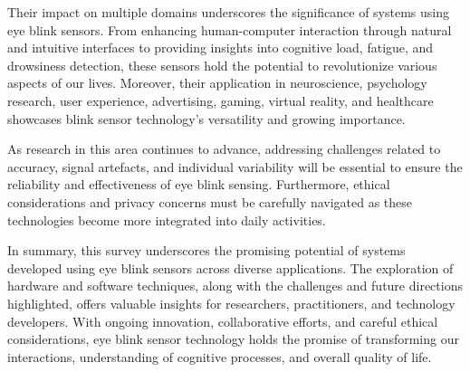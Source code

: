 \documentclass[conference]{IEEEtran}
\begin{document}
Their impact on multiple domains underscores the significance of systems using eye blink sensors. From enhancing human-computer interaction through natural and intuitive interfaces to providing insights into cognitive load, fatigue, and drowsiness detection, these sensors hold the potential to revolutionize various aspects of our lives. Moreover, their application in neuroscience, psychology research, user experience, advertising, gaming, virtual reality, and healthcare showcases blink sensor technology's versatility and growing importance.

As research in this area continues to advance, addressing challenges related to accuracy, signal artefacts, and individual variability will be essential to ensure the reliability and effectiveness of eye blink sensing. Furthermore, ethical considerations and privacy concerns must be carefully navigated as these technologies become more integrated into daily activities.

In summary, this survey underscores the promising potential of systems developed using eye blink sensors across diverse applications. The exploration of hardware and software techniques, along with the challenges and future directions highlighted, offers valuable insights for researchers, practitioners, and technology developers. With ongoing innovation, collaborative efforts, and careful ethical considerations, eye blink sensor technology holds the promise of transforming our interactions, understanding of cognitive processes, and overall quality of life.
\end{document}
